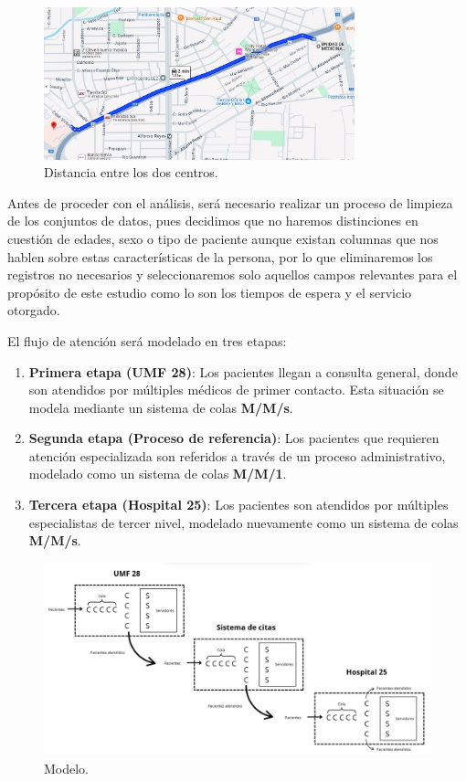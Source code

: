 \documentclass[10pt]{article}
\begin{document}
    \begin{figure}[h]
		\centering
		\includegraphics[width=90mm]{./images/mapa.jpg}
		\caption{Distancia entre los dos centros.}
	\end{figure}
	\FloatBarrier

    Antes de proceder con el análisis, será necesario realizar un proceso de limpieza de los conjuntos de datos, pues decidimos que no haremos distinciones en cuestión de edades, sexo o tipo de paciente aunque existan columnas que nos hablen sobre estas características de la persona, por lo que eliminaremos los registros no necesarios y seleccionaremos solo aquellos campos relevantes para el propósito de este estudio como lo son los tiempos de espera y el servicio otorgado.
    
    El flujo de atención será modelado en tres etapas:

    \begin{enumerate}
        \item \textbf{Primera etapa (UMF 28)}: Los pacientes llegan a consulta general, donde son atendidos por múltiples médicos de primer contacto. Esta situación se modela mediante un sistema de colas \textbf{M/M/s}.
        
        \item \textbf{Segunda etapa (Proceso de referencia)}: Los pacientes que requieren atención especializada son referidos a través de un proceso administrativo, modelado como un sistema de colas \textbf{M/M/1}.
        
        \item \textbf{Tercera etapa (Hospital 25)}: Los pacientes son atendidos por múltiples especialistas de tercer nivel, modelado nuevamente como un sistema de colas \textbf{M/M/s}.
    \end{enumerate}

    \begin{figure}[h]
		\centering
		\includegraphics[width=130mm]{./images/sistema.jpg}
		\caption{Modelo.}
	\end{figure}
\end{document}
